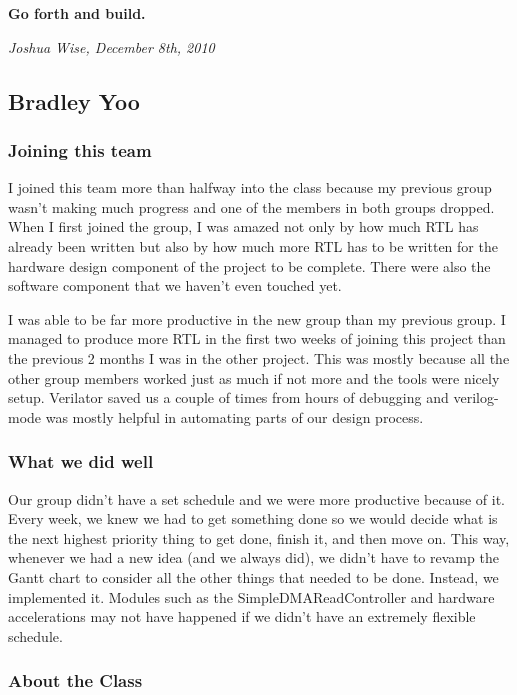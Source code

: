 \documentclass[10pt]{report}
\begin{document}
\textbf{Go forth and build.}

\hfill\textit{Joshua Wise, December 8th, 2010}

\subsection{Bradley Yoo}

\subsubsection{Joining this team}

I joined this team more than halfway into the class because my previous group wasn't making much progress and one of the members in both groups dropped. When I first joined the group, I was amazed not only by how much RTL has already been written but also by how much more RTL has to be written for the hardware design component of the project to be complete. There were also the software component that we haven't even touched yet.

I was able to be far more productive in the new group than my previous group. I managed to produce more RTL in the first two weeks of joining this project than the previous 2 months I was in the other project. This was mostly because all the other group members worked just as much if not more and the tools were nicely setup. Verilator saved us a couple of times from hours of debugging and verilog-mode was mostly helpful in automating parts of our design process.

\subsubsection{What we did well}

Our group didn't have a set schedule and we were more productive because of it. Every week, we knew we had to get something done so we would decide what is the next highest priority thing to get done, finish it, and then move on. This way, whenever we had a new idea (and we always did), we didn't have to revamp the Gantt chart to consider all the other things that needed to be done. Instead, we implemented it. Modules such as the SimpleDMAReadController and hardware accelerations may not have happened if we didn't have an extremely flexible schedule.

\subsubsection{About the Class}
\end{document}

